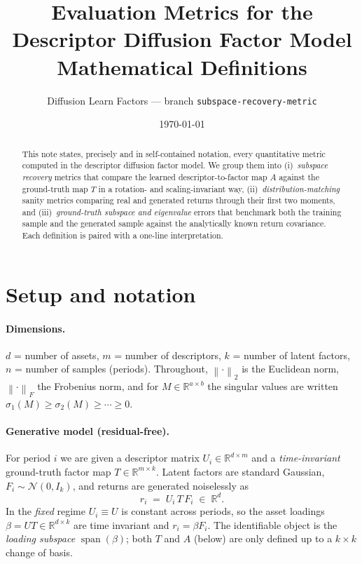 \documentclass[11pt]{article}
\title{\textbf{Evaluation Metrics for the Descriptor Diffusion Factor Model}\\[4pt]
\large Mathematical Definitions}
\author{Diffusion Learn Factors --- branch \texttt{subspace-recovery-metric}}
\date{\today}
\newcommand{\R}{\mathbb{R}}
\newcommand{\norm}[1]{\left\lVert #1 \right\rVert}
\newcommand{\fro}[1]{\norm{#1}_{F}}
\newcommand{\twonorm}[1]{\norm{#1}_{2}}
\newcommand{\range}{\operatorname{span}}
\begin{document}
\maketitle

\begin{abstract}
This note states, precisely and in self-contained notation, every quantitative
metric computed in the descriptor diffusion factor model. We group them into
(i)~\emph{subspace recovery} metrics that compare the learned descriptor-to-factor
map $A$ against the ground-truth map $T$ in a rotation- and scaling-invariant way,
(ii)~\emph{distribution-matching} sanity metrics comparing real and generated
returns through their first two moments, and (iii)~\emph{ground-truth subspace and
eigenvalue} errors that benchmark both the training sample and the generated sample
against the analytically known return covariance. Each definition is paired with a
one-line interpretation.
\end{abstract}

\section{Setup and notation}

\paragraph{Dimensions.}
$d$ = number of assets, $m$ = number of descriptors, $k$ = number of latent
factors, $n$ = number of samples (periods). Throughout, $\twonorm{\cdot}$ is the
Euclidean norm, $\fro{\cdot}$ the Frobenius norm, and for $M\in\R^{a\times b}$
the singular values are written $\sigma_1(M)\ge\sigma_2(M)\ge\cdots\ge 0$.

\paragraph{Generative model (residual-free).}
For period $i$ we are given a descriptor matrix $U_i\in\R^{d\times m}$ and a
\emph{time-invariant} ground-truth factor map $T\in\R^{m\times k}$. Latent factors
are standard Gaussian, $F_i\sim\mathcal N(0,I_k)$, and returns are generated noiselessly as
\begin{equation}
  r_i \;=\; U_i\,T\,F_i \;\in\; \R^{d}.
  \label{eq:genmodel}
\end{equation}
In the \emph{fixed} regime $U_i\equiv U$ is constant across periods, so the
asset loadings $\beta = U T\in\R^{d\times k}$ are time invariant and
$r_i=\beta F_i$. The identifiable object is the \emph{loading subspace}
$\range(\beta)$; both $T$ and $A$ (below) are only defined up to a $k\times k$
change of basis.
\end{document}
